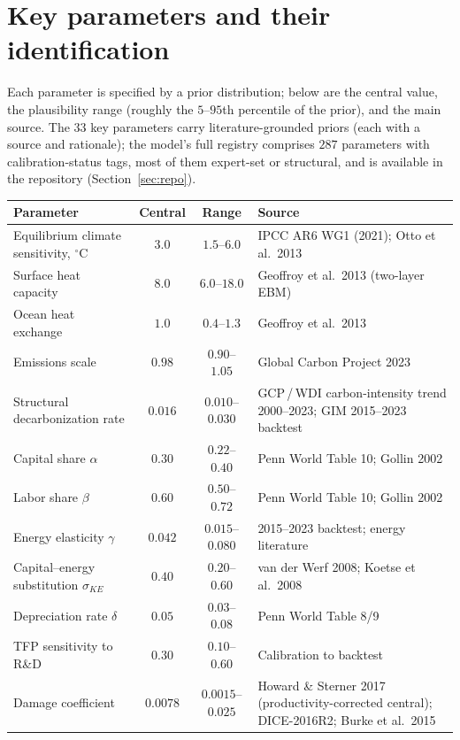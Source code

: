\documentclass[a4paper,fleqn]{cas-sc}
\begin{document}
\clearpage
\appendix
\section{Key parameters and their identification}
\label{app:params}

Each parameter is specified by a prior distribution; below are the central value, the plausibility
range (roughly the $5$--$95$th percentile of the prior), and the main source. The $33$ key parameters carry
literature-grounded priors (each with a source and rationale); the model's full registry comprises
$287$ parameters with calibration-status tags, most of them expert-set or structural, and is
available in the repository (Section~\ref{sec:repo}).

\begin{table}[h]
\centering
\small
\begin{tabularx}{\linewidth}{@{}lccL@{}}
\toprule
Parameter & Central & Range & Source \\
\midrule
Equilibrium climate sensitivity, $^\circ$C & $3.0$ & $1.5$--$6.0$ & IPCC AR6 WG1 (2021); Otto et al.\ 2013 \\
Surface heat capacity & $8.0$ & $6.0$--$18.0$ & Geoffroy et al.\ 2013 (two-layer EBM) \\
Ocean heat exchange & $1.0$ & $0.4$--$1.3$ & Geoffroy et al.\ 2013 \\
Emissions scale & $0.98$ & $0.90$--$1.05$ & Global Carbon Project 2023 \\
Structural decarbonization rate & $0.016$ & $0.010$--$0.030$ & GCP\,/\,WDI carbon-intensity trend 2000--2023; GIM 2015--2023 backtest \\
Capital share $\alpha$ & $0.30$ & $0.22$--$0.40$ & Penn World Table 10; Gollin 2002 \\
Labor share $\beta$ & $0.60$ & $0.50$--$0.72$ & Penn World Table 10; Gollin 2002 \\
Energy elasticity $\gamma$ & $0.042$ & $0.015$--$0.080$ & 2015--2023 backtest; energy literature \\
Capital--energy substitution $\sigma_{KE}$ & $0.40$ & $0.20$--$0.60$ & van der Werf 2008; Koetse et al.\ 2008 \\
Depreciation rate $\delta$ & $0.05$ & $0.03$--$0.08$ & Penn World Table 8/9 \\
TFP sensitivity to R\&D & $0.30$ & $0.10$--$0.60$ & Calibration to backtest \\
Damage coefficient & $0.0078$ & $0.0015$--$0.025$ & Howard \& Sterner 2017 (productivity-corrected central); DICE-2016R2; Burke et al.\ 2015 \\

\end{tabularx}
\end{table}
\end{document}
